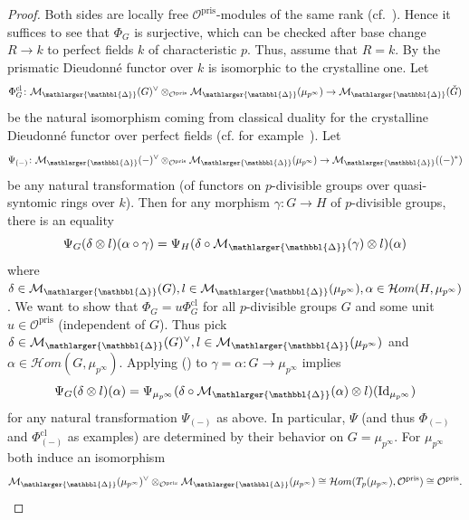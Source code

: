 \documentclass{amsart}
\newcommand{\prism}{{\mathlarger{\mathbbl{\Delta}}}}
\theoremstyle{plain}
\theoremstyle{definition}
\newcommand{\pris}{\mathrm{pris}}
\begin{document}
\begin{proof}
  Both sides are locally free $\mathcal{O}^\pris$-modules of the same rank (cf.\ ). Hence it suffices to see that $\Phi_G$ is surjective, which can be checked after base change $R\to k$ to perfect fields $k$ of characteristic $p$. Thus, assume that $R=k$. By  the prismatic Dieudonn\'e functor over $k$ is isomorphic to the crystalline one. Let
  $$
  \Phi_G^{\mathrm{cl}}\colon \mathcal{M}_{\prism}(G)^\vee\otimes_{\mathcal{O}^\pris}\mathcal{M}_\prism(\mu_{p^\infty})\to \mathcal{M}_{\prism}(\check{G})
  $$
  be the natural isomorphism coming from classical duality for the crystalline Dieudonn\'e functor over perfect fields (cf. for example\ \cite[Proposition III 5.1.iii)]{fontaine_groupes_p_divisibles_sur_les_corps_locaux}).
Let
$$
\Psi_{(-)}\colon \mathcal{M}_{\prism}(-)^\vee\otimes_{\mathcal{O}^\pris}\mathcal{M}_\prism(\mu_{p^\infty})\to \mathcal{M}_{\prism}((-)^\ast)
$$
be any natural transformation (of functors on $p$-divisible groups over quasi-syntomic rings over $k$). Then for any morphism $\gamma\colon G\to H$ of $p$-divisible groups, there is an equality
\begin{equation}
  \label{eq:1}
\Psi_G(\delta\otimes l)(\alpha\circ \gamma)=\Psi_H(\delta\circ \mathcal{M}_{\prism}(\gamma)\otimes l)(\alpha)  
\end{equation}
where $\delta\in \mathcal{M}_\prism(G), l\in \mathcal{M}_{\prism}(\mu_{p^\infty}), \alpha\in \mathcal{H}om(H,\mu_{p^\infty})$.
We want to show that $\Phi_G=u\Phi^{\mathrm{cl}}_G$ for all $p$-divisible groups $G$ and some unit $u\in \mathcal{O}^{\pris}$ (independent of $G$). Thus pick $\delta\in \mathcal{M}_\prism(G)^\vee, l\in \mathcal{M}_\prism(\mu_{p^\infty})$ and $\alpha\in \mathcal{H}om(G,\mu_{p^\infty})$. Applying () to $\gamma=\alpha\colon G\to \mu_{p^\infty}$ implies
$$
\Psi_G(\delta\otimes l)(\alpha)=\Psi_{\mu_{p^\infty}}(\delta\circ \mathcal{M}_{\prism}(\alpha)\otimes l)(\mathrm{Id}_{\mu_{p^\infty}})
$$
for any natural transformation $\Psi_{(-)}$ as above. In particular, $\Psi$ (and thus $\Phi_{(-)}$ and $\Phi^{\mathrm{cl}}_{(-)}$ as examples) are determined by their behavior on $G=\mu_{p^\infty}$. For $\mu_{p^\infty}$ both induce an isomorphism
$$
\mathcal{M}_{\prism}(\mu_{p^\infty})^\vee\otimes_{\mathcal{O}^\pris} \mathcal{M}_{\prism}(\mu_{p^\infty})\cong \mathcal{H}om(T_p(\mu_{p^\infty}),\mathcal{O}^\pris)\cong \mathcal{O}^\pris.
$$

\end{proof}
\end{document}
